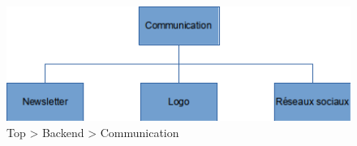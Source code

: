 \begin{figure}[H]
  \vspace*{2cm}
  \caption{Top \textgreater{} Backend \textgreater{} Communication}
  \centering
  \vspace*{0.5cm}
  \includegraphics[max width=18cm]{wbs3_comm.png}
\end{figure}
